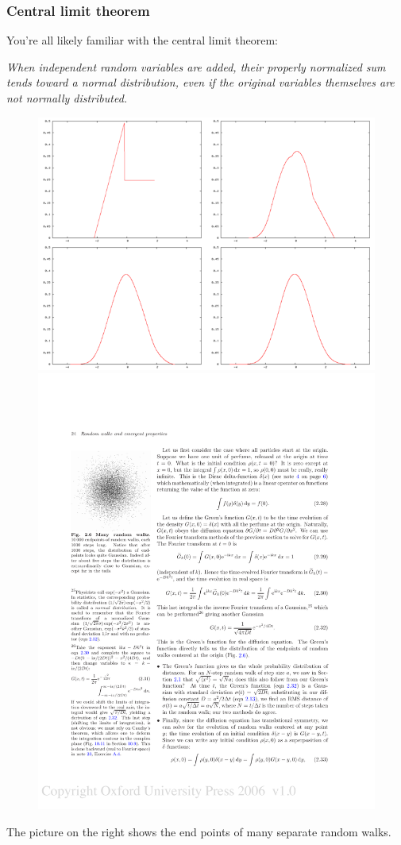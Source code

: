 \documentclass[hyperref={colorlinks=true}]{beamer}
\begin{document}
\begin{frame}%
  \frametitle{Central limit theorem}
  
  You're all likely familiar with the central limit theorem:
  
  \begin{center}
    \textit{When independent random variables are added, their properly normalized sum tends toward a normal distribution, even if the original variables themselves are not normally distributed.}
  \end{center}
  
  \begin{figure}
    \centering
    \includegraphics[width=0.45\columnwidth]{Central_limit_theorem.png}
    \includegraphics[width=0.35\columnwidth]{RandomWalk2DEndpoints.pdf}
  \end{figure}
  
  The picture on the right shows the end points of many separate random walks.
  
\end{frame}

\end{document}

